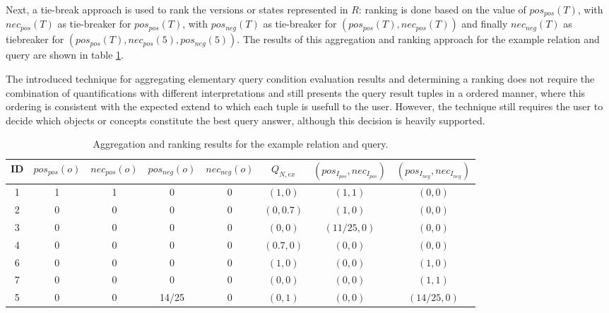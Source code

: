 \documentclass[runningheads,a4paper]{llncs}
\begin{document}
Next, a tie-break approach is used to rank the versions or states represented in $R$: ranking is done based on the value of $pos_{pos}(T)$, with $nec_{pos}(T)$ as tie-breaker for $pos_{pos}(T)$, with $pos_{neg}(T)$ as tie-breaker for $(pos_{pos}(T), nec_{pos}(T))$ and finally $nec_{neg}(T)$ as tiebreaker for $(pos_{pos}(T), nec_{pos}(5), pos_{neg}(5))$. The results of this aggregation and ranking approach for the example relation and query are shown in table \ref{tab:ex-ranking}.

The introduced technique for aggregating elementary query condition evaluation results and determining a ranking does not require the combination of quantifications with different interpretations and still presents the query result tuples in a ordered manner, where this ordering is consistent with the expected extend to which each tuple is usefull to the user. However, the technique still requires the user to decide which objects or concepts constitute the best query answer, although this decision is heavily supported.

\vspace{-10pt}
\begin{table}[ht]
\caption{Aggregation and ranking results for the example relation and query.}
\centering
\begin{tabular}{|c|c|c|c|c||c|c|c|}
\hline
\textbf{ID} & \textbf{$pos_{pos}(o)$} & \textbf{$nec_{pos}(o)$} & \textbf{$pos_{neg}(o)$} & \textbf{$nec_{neg}(o)$} & \textbf{$Q_{N,ex}$} & \textbf{$(pos_{I_{pos}}, nec_{I_{pos}})$} & \textbf{$(pos_{I_{neg}}, nec_{I_{neg}})$} \\
\hline
\hline
1 & 1 & 1 & 0 & 0 & $(1, 0)$ & $(1,1)$ & $(0,0)$ \\
\hline
2 & 0 & 0 & 0 & 0 & $(0, 0.7)$ & $(1,0)$ & $(0,0)$ \\
\hline
3 & 0 & 0 & 0 & 0 & $(0, 0)$ & $(11/25,0)$ & $(0,0)$ \\
\hline
4 & 0 & 0 & 0 & 0 & $(0.7, 0)$ & $(0,0)$ & $(0,0)$ \\
\hline
6 & 0 & 0 & 0 & 0 & $(1, 0)$ & $(0,0)$ & $(1,0)$ \\
\hline
7 & 0 & 0 & 0 & 0 & $(0, 0)$ & $(0,0)$ & $(1,1)$ \\
\hline
5 & 0 & 0 & 14/25 & 0 & $(0, 1)$ & $(0,0)$ & $(14/25,0)$ \\
\hline
\end{tabular}
\label{tab:ex-ranking}
\end{table}
\vspace{-15pt}
\end{document}
